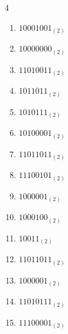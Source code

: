 \begin{multicols}{4}
\begin{enumerate}
        \phantom{$=132$}

  \item $10001001_{(2)}$

        \phantom{$=137$}

\columnbreak %

  \item $10000000_{(2)}$

        \phantom{$=128$}

  \item $11010011_{(2)}$

        \phantom{$=211$}

  \item $1011011_{(2)}$

        \phantom{$=91$}

  \item $1010111_{(2)}$

        \phantom{$=87$}

  \item $10100001_{(2)}$

        \phantom{$=161$}

  \item $11011011_{(2)}$

        \phantom{$=219$}

  \item $11100101_{(2)}$

        \phantom{$=229$}

  \item $1000001_{(2)}$

        \phantom{$=65$}

  \item $1000100_{(2)}$

        \phantom{$=68$}

  \item $10011_{(2)}$

        \phantom{$=19$}

  \item $11011011_{(2)}$

        \phantom{$=219$}

  \item $1000001_{(2)}$

        \phantom{$=65$}

  \item $11010111_{(2)}$

        \phantom{$=215$}

  \item $11100001_{(2)}$


\end{enumerate}
\end{multicols}
